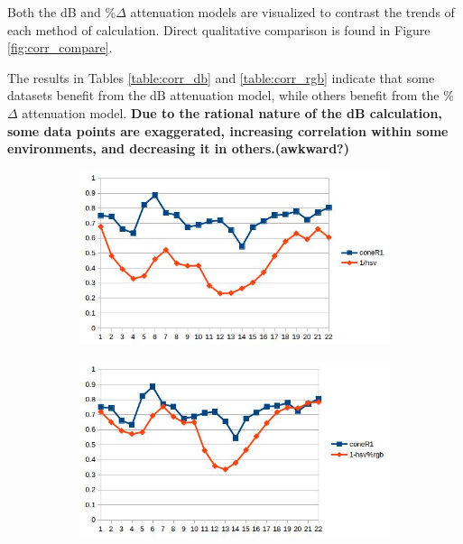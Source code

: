 \documentclass[12pt]{report}
\begin{document}
Both the dB and \%$\Delta$ attenuation models are visualized to contrast the trends of each method of calculation. Direct qualitative comparison is found in Figure \ref{fig:corr_compare}. 

The results in Tables \ref{table:corr_db} and \ref{table:corr_rgb} indicate that some datasets benefit from the dB attenuation model, while others benefit from the \%$\Delta$ attenuation model. \textbf{Due to the rational nature of the dB calculation,  some data points are exaggerated, increasing correlation within some environments, and decreasing it in others.(awkward?)}

\begin{figure}
\centering
\begin{subfigure}{.49\linewidth}
  \includegraphics[width=1\linewidth]{figures/correlations/db/room_hsv.jpg}
  \caption{}
\end{subfigure}
\hfill
\begin{subfigure}{.49\linewidth}
  \includegraphics[width=1\linewidth]{figures/correlations/rgb/room_hsv.jpg}
  \caption{}
\end{subfigure}

\end{figure}
\end{document}
